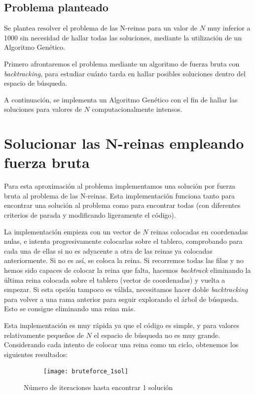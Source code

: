 \documentclass[12pt]{article}
\begin{document}
\subsection{Problema planteado}
Se plantea resolver el problema de las N-reinas para un valor de $N$ muy inferior a 1000 sin necesidad de hallar todas las soluciones, mediante la utilización de un Algoritmo Genético.

Primero afrontaremos el problema mediante un algoritmo de fuerza bruta con \emph{backtracking}, para estudiar cuánto tarda en hallar posibles soluciones dentro del espacio de búsqueda.

A continuación, se implementa un Algoritmo Genético con el fin de hallar las soluciones para valores de $N$ computacionalmente intensos.

\section{Solucionar las N-reinas empleando fuerza bruta}

Para esta aproximación al problema implementamos una solución por fuerza bruta al problema de las N-reinas. Esta implementación funciona tanto para encontrar una solución al problema como para encontrar todas (con diferentes criterios de parada y modificando ligeramente el código).

La implementación empieza con un vector de $N$ reinas colocadas en coordenadas nulas, e intenta progresivamente colocarlas sobre el tablero, comprobando para cada una de ellas si no es adyacente a otra de las reinas ya colocadas anteriormente. Si no es así, se coloca la reina. Si recorremos todas las filas y no hemos sido capaces de colocar la reina que falta, hacemos \emph{backtrack} eliminando la última reina colocada sobre el tablero (vector de coordenadas) y vuelta a empezar. Si esta opción tampoco es válida, necesitamos hacer doble \emph{backtracking} para volver a una rama anterior para seguir explorando el árbol de búsqueda. Esto se consigue eliminando una reina más.

Esta implementación es muy rápida ya que el código es simple, y para valores relativamente pequeños de $N$ el espacio de búsqueda no es muy grande. Considerando cada intento de colocar una reina como un ciclo, obtenemos los siguientes resultados:

\begin{figure}[h]
    \center
    \begin{subfigure}{.80\textwidth}
        \texttt{[image: bruteforce\_1sol]}
    \end{subfigure}
    \caption{Número de iteraciones hasta encontrar 1 solución}
\end{figure}
\end{document}
